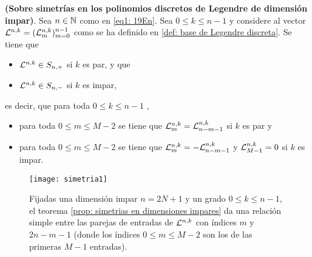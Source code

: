 \begin{teo}
\label{prop: simetrias en dimensiones impares}
\textbf{(Sobre simetrías
en los polinomios discretos de Legendre de dimensión impar)}. 
Sea $n \in \mathbb{N}$ como en \eqref{eq1: 19En}.
Sea $0 \leq k \leq n-1$ y
considere al vector $\mathcal{L}^{n,k}=(\mathcal{L}^{n,k}_{m})_{m=0}^{n-1}$
como se ha definido en \eqref{def: base de Legendre discreta}. 
Se tiene que 
\begin{itemize}
\item $\mathcal{L}^{n,k} \in S_{n,+}$ si $k$ es par, y que
\item $\mathcal{L}^{n,k} \in S_{n,-}$ si $k$ es impar,
\end{itemize}
es decir, que para toda $0 \leq k \leq n-1$ ,
\begin{itemize}
\item para toda $0 \leq m \leq M-2$ se tiene que 
$\mathcal{L}^{n,k}_{m} = \mathcal{L}^{n,k}_{n-m-1}$ si $k$ es par y
\item para toda $0 \leq m \leq M-2$ 
se tiene que $\mathcal{L}^{n,k}_{m} = -\mathcal{L}^{n,k}_{n-m-1}$ y 
$\mathcal{L}^{n, k}_{M-1}=0$ si $k$ es impar.
\end{itemize}
\end{teo}
\begin{figure}[H]
\centering\captionsetup{format = hang}
	\begin{measuredfigure}
		\texttt{[image: simetria1]} 
		\caption{	
		Fijadas una dimensión impar $n=2N+1$ 
		y un grado $0 \leq k \leq n-1$,
		el teorema \ref{prop: simetrias en dimensiones impares}
		da una relación simple entre las parejas 
		de entradas de $\mathcal{L}^{n,k}$ con índices $m$ y $2n-m-1$ 
		(donde los índices $0 \leq m \leq M-2$ son los de las primeras
		$M-1$ entradas).}
 	\end{measuredfigure}
 \end{figure}



\begin{comment}

{\huge{$\cali{L}^{n,k} = 
\left(
\cali{L}^{n,k}_{0} , \cali{L}^{n,k}_{1}, \ldots ,
\cali{L}^{n,k}_{M-2}, \cali{L}^{n,k}_{M-1}, \cali{L}^{n,k}_{M},
\ldots , \cali{L}^{n,k}_{n-2}, \cali{L}^{n,k}_{n-1}
\right)
$}}

\vspace{2cm}

{\huge{$\cali{L}^{n,k} = 
\left(
\cali{L}^{n,k}_{0} , \cali{L}^{n,k}_{1}, \ldots ,
\cali{L}^{n,k}_{M-1}, \cali{L}^{n,k}_{M},
\ldots , \cali{L}^{n,k}_{n-2}, \cali{L}^{n,k}_{n-1}
\right)
$}}

\end{comment}



